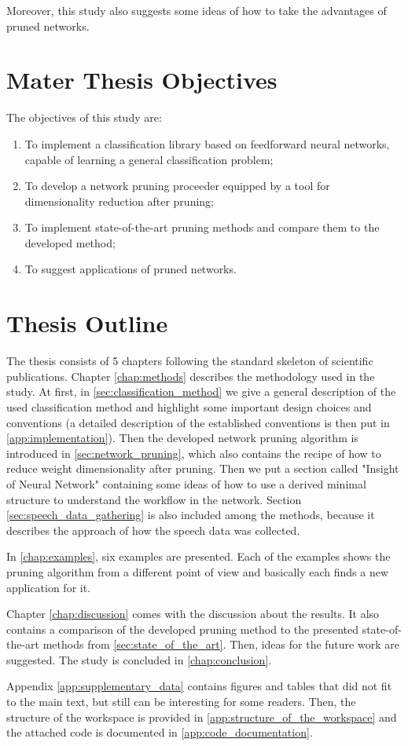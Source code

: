 Moreover, this study also suggests some ideas of how to take the advantages of pruned networks.

\section{Mater Thesis Objectives} \label{sec:thesis_objectives}
The objectives of this study are:

\begin{enumerate}
\item To implement a classification library based on feedforward neural networks, capable of learning a general classification problem;
\item To develop a network pruning proceeder equipped by a tool for dimensionality reduction after pruning;
\item To implement state-of-the-art pruning methods and compare them to the developed method;
\item To suggest applications of pruned networks.
\end{enumerate}

\section{Thesis Outline} \label{sec:thesis_outline}
The thesis consists of 5 chapters following the standard skeleton of scientific publications. Chapter \ref{chap:methods} describes the methodology used in the study. At first, in \cref{sec:classification_method} we give a general description of the used classification method and highlight some important design choices and conventions (a detailed description of the established conventions is then put in \cref{app:implementation}). Then the developed network pruning algorithm is introduced in \cref{sec:network_pruning}, which also contains the recipe of how to reduce weight dimensionality after pruning. Then we put a section called "Insight of Neural Network" containing some ideas of how to use a derived minimal structure to understand the workflow in the network. Section \ref{sec:speech_data_gathering} is also included among the methods, because it describes the approach of how the speech data was collected.

In \cref{chap:examples}, six examples are presented. Each of the examples shows the pruning algorithm from a different point of view and basically each finds a new application for it.

Chapter \ref{chap:discussion} comes with the discussion about the results. It also contains a comparison of the developed pruning method to the presented state-of-the-art methods from \cref{sec:state_of_the_art}. Then, ideas for the future work are suggested. The study is concluded in \cref{chap:conclusion}.

Appendix \ref{app:supplementary_data} contains figures and tables that did not fit to the main text, but still can be interesting for some readers. Then, the structure of the workspace is provided in \cref{app:structure_of_the_workspace} and the attached code is documented in \cref{app:code_documentation}.